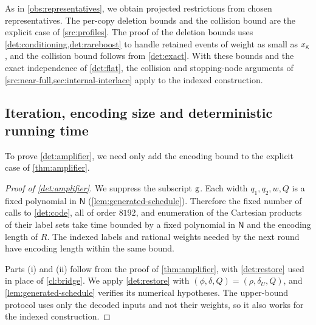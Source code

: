 \documentclass[11pt,letterpaper]{article} \usepackage[utf8]{inputenc}
\theoremstyle{plain} \newtheorem{theorem}{Theorem}[section]
\theoremstyle{definition} \newaliascnt{definition}{theorem}
\begin{document}
As in \cref{obs:representatives}, we obtain projected restrictions from
chosen representatives. The per-copy deletion bounds and the collision
bound are the explicit case of \cref{src:profiles}. The proof of the deletion bounds uses
\cref{det:conditioning,det:rareboost} to handle retained events of weight
as small as $x_{\rm g}$, and the collision bound follows from \cref{det:exact}.
With these bounds and the exact independence of \cref{det:flat}, the collision and stopping-node
arguments of \cref{src:near-full,sec:internal-interlace} apply to the
indexed construction.

\subsection{Iteration, encoding size and deterministic running time}
\label{sec:deterministic-endpoints}

To prove \cref{det:amplifier}, we need only add the encoding bound to the
explicit case of \cref{thm:amplifier}.

\begin{proof}[Proof of \cref{det:amplifier}]
\label{proof:det:amplifier}
We suppress the subscript $\rm g$. Each width $q_1,q_2,w,Q$ is a fixed polynomial
in $\mathsf N$ (\cref{lem:generated-schedule}). Therefore the fixed number of calls to \cref{det:code}, all of order
$8192$, and enumeration of the Cartesian products of their label sets take time bounded by a fixed polynomial
in $\mathsf N$ and the encoding length of $R$. The indexed labels and rational
weights needed by the next round have encoding length within the same bound.

Parts (i) and (ii) follow from the proof of \cref{thm:amplifier}, with
\cref{det:restore} used in place of \cref{cl:bridge}. We apply \cref{det:restore}
with $(\phi,\delta,Q)=(\rho,\delta_U,Q)$, and \cref{lem:generated-schedule}
verifies its numerical hypotheses. The upper-bound
protocol uses only the decoded inputs and not their weights, so it also works
for the indexed construction.
\end{proof}
\end{document}
